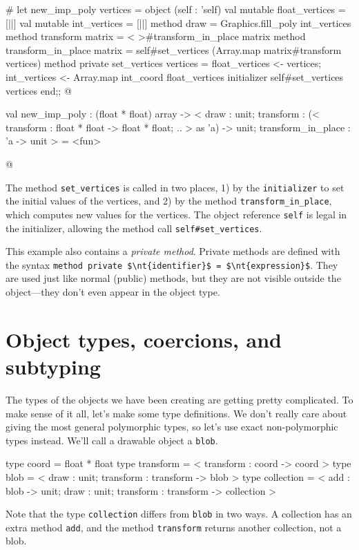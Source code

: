 \begin{ocaml}
# let new_imp_poly vertices =
object (self : 'self)
   val mutable float_vertices = [||]
   val mutable int_vertices = [||]
   method draw = Graphics.fill_poly int_vertices
   method transform matrix = {< >}#transform_in_place matrix
   method transform_in_place matrix =
      self#set_vertices (Array.map matrix#transform vertices)
   method private set_vertices vertices =
      float_vertices <- vertices;
      int_vertices <- Array.map int_coord float_vertices
   initializer
      self#set_vertices vertices
end;;
@
\begin{topoutput}
val new_imp_poly : (float * float) array ->
  < draw : unit;
    transform : (< transform : float * float -> float * float; .. > as 'a) -> unit;
    transform_in_place : 'a -> unit > = <fun>
\end{topoutput}
@
\end{ocaml}
%
The method \hbox{\lstinline/set_vertices/} is called in two places, 1) by the \hbox{\lstinline/initializer/} to set
the initial values of the vertices, and 2) by the method \hbox{\lstinline/transform_in_place/}, which
computes new values for the vertices.  The object reference \hbox{\lstinline/self/} is legal in the
initializer, allowing the method call \hbox{\lstinline/self#set_vertices/}.

\label{keyword:private}
This example also contains a \emph{private method}.  Private methods are defined with the syntax
\hbox{\lstinline/method private $\nt{identifier}$ = $\nt{expression}$/}.
They are used just like normal (public) methods, but they are not visible outside the object---they
don't even appear in the object type.

\section{Object types, coercions, and subtyping}

The types of the objects we have been creating are getting pretty complicated.
To make sense of it all, let's make some type definitions.  We don't really care about
giving the most general polymorphic types, so let's use exact non-polymorphic types instead.  We'll
call a drawable object a \hbox{\lstinline/blob/}.

\begin{ocaml}
type coord = float * float
type transform = < transform : coord -> coord >
type blob = < draw : unit; transform : transform -> blob >
type collection =
   < add : blob -> unit;
     draw : unit;
     transform : transform -> collection
   >
\end{ocaml}
%
Note that the type \hbox{\lstinline/collection/} differs from \hbox{\lstinline/blob/} in two ways.  A collection
has an extra method \hbox{\lstinline/add/}, and the method \hbox{\lstinline/transform/} returns another
collection, not a blob.

